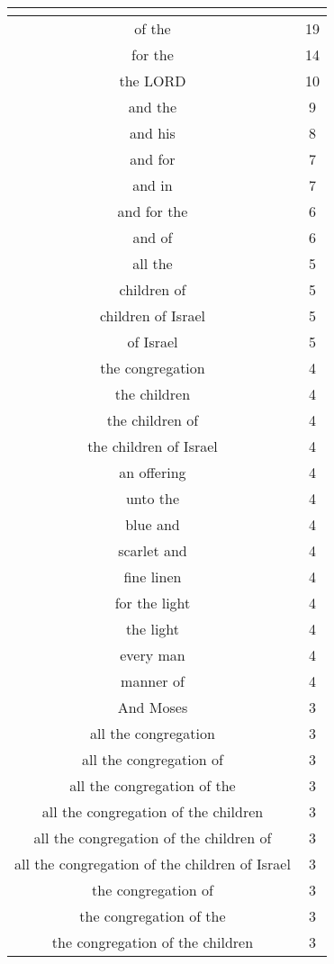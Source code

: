 \begin{center}
\begin{longtable}{|c|c|}
\hline \multicolumn{2}{c}{{ }} \\ \hline
\endfoot 
of the & 19\\ \hline 
for the & 14\\ \hline 
the LORD & 10\\ \hline 
and the & 9\\ \hline 
and his & 8\\ \hline 
and for & 7\\ \hline 
and in & 7\\ \hline 
and for the & 6\\ \hline 
and of & 6\\ \hline 
all the & 5\\ \hline 
children of & 5\\ \hline 
children of Israel & 5\\ \hline 
of Israel & 5\\ \hline 
the congregation & 4\\ \hline 
the children & 4\\ \hline 
the children of & 4\\ \hline 
the children of Israel & 4\\ \hline 
an offering & 4\\ \hline 
unto the & 4\\ \hline 
blue and & 4\\ \hline 
scarlet and & 4\\ \hline 
fine linen & 4\\ \hline 
for the light & 4\\ \hline 
the light & 4\\ \hline 
every man & 4\\ \hline 
manner of & 4\\ \hline 
And Moses & 3\\ \hline 
all the congregation & 3\\ \hline 
all the congregation of & 3\\ \hline 
all the congregation of the & 3\\ \hline 
all the congregation of the children & 3\\ \hline 
all the congregation of the children of & 3\\ \hline 
all the congregation of the children of Israel & 3\\ \hline 
the congregation of & 3\\ \hline 
the congregation of the & 3\\ \hline 
the congregation of the children & 3\\ \hline 

\end{longtable}
\end{center}
